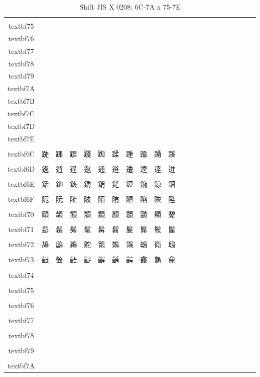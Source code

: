 \begin{table}[H]
\centering
\caption{Shift JIS X 0208: 6C-7A x 75-7E}
\begin{tabular}{|Sc|Sc|Sc|Sc|Sc|Sc|Sc|Sc|Sc|Sc|Sc|}
\hline
 & \\textbf{75} & \\textbf{76} & \\textbf{77} & \\textbf{78} & \\textbf{79} & \\textbf{7A} & \\textbf{7B} & \\textbf{7C} & \\textbf{7D} & \\textbf{7E} \\ \hline
\\textbf{6C} & 跿 & 踝 & 踞 & 踐 & 踟 & 蹂 & 踵 & 踰 & 踴 & 蹊 \\ \hline
\\textbf{6D} & 逡 & 逍 & 逞 & 逖 & 逋 & 逧 & 逶 & 逵 & 逹 & 迸 \\ \hline
\\textbf{6E} & 銛 & 鉚 & 鋏 & 銹 & 銷 & 鋩 & 錏 & 鋺 & 鍄 & 錮 \\ \hline
\\textbf{6F} & 阨 & 阮 & 阯 & 陂 & 陌 & 陏 & 陋 & 陷 & 陜 & 陞 \\ \hline
\\textbf{70} & 頤 & 頡 & 頷 & 頽 & 顆 & 顏 & 顋 & 顫 & 顯 & 顰 \\ \hline
\\textbf{71} & 髟 & 髢 & 髣 & 髦 & 髯 & 髫 & 髮 & 髴 & 髱 & 髷 \\ \hline
\\textbf{72} & 鴣 & 鴟 & 鵄 & 鴕 & 鴒 & 鵁 & 鴿 & 鴾 & 鵆 & 鵈 \\ \hline
\\textbf{73} & 齦 & 齧 & 齬 & 齪 & 齷 & 齲 & 齶 & 龕 & 龜 & 龠 \\ \hline
\\textbf{74} &  &  &  &  &  &  &  &  &  &  \\ \hline
\\textbf{75} &  &  &  &  &  &  &  &  &  &  \\ \hline
\\textbf{76} &  &  &  &  &  &  &  &  &  &  \\ \hline
\\textbf{77} &  &  &  &  &  &  &  &  &  &  \\ \hline
\\textbf{78} &  &  &  &  &  &  &  &  &  &  \\ \hline
\\textbf{79} &  &  &  &  &  &  &  &  &  &  \\ \hline
\\textbf{7A} &  &  &  &  &  &  &  &  &  &  \\ \hline
\end{tabular}
\end{table}

